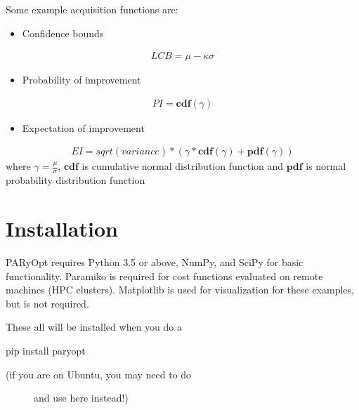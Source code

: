 \documentclass[letterpaper,12pt,english]{sphinxmanual}
\begin{document}
\sphinxAtStartPar
Some example acquisition functions are:
\begin{itemize}
\item {} 
\sphinxAtStartPar
Confidence bounds

\end{itemize}
\begin{equation*}
\begin{split}LCB = \mu - \kappa \sigma\end{split}
\end{equation*}\begin{itemize}
\item {} 
\sphinxAtStartPar
Probability of improvement

\end{itemize}
\begin{equation*}
\begin{split}PI = \mathbf{cdf}(\gamma)\end{split}
\end{equation*}\begin{itemize}
\item {} 
\sphinxAtStartPar
Expectation of improvement

\end{itemize}
\begin{equation*}
\begin{split}EI = sqrt(variance) * (\gamma * \mathbf{cdf}(\gamma) + \mathbf{pdf}(\gamma))\end{split}
\end{equation*}
\sphinxAtStartPar
where \(\gamma = \frac{\mu}{\sigma}\), \(\mathbf{cdf}\) is cumulative normal distribution function and
\(\mathbf{pdf}\) is normal probability distribution function


\chapter{Installation}
\label{\detokenize{installation:installation}}\label{\detokenize{installation::doc}}
\sphinxAtStartPar
PARyOpt requires Python 3.5 or above, NumPy, and SciPy for basic functionality.
Paramiko is required for cost functions evaluated on remote machines
(HPC clusters). Matplotlib is used for visualization for these examples,
but is not required.

\sphinxAtStartPar
These all will be installed when you do a

\begin{sphinxVerbatim}[commandchars=\\\{\}]
pip install paryopt
\end{sphinxVerbatim}
\begin{description}
\item[{(if you are on Ubuntu, you may need to do }] \leavevmode
\sphinxAtStartPar
and use  here instead!)

\end{description}
\end{document}
